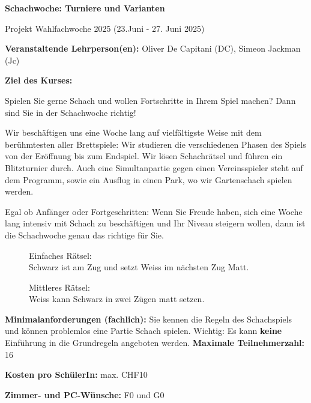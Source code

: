 \documentclass[12pt]{article}
\begin{document}


 
        \Large
        \textbf{Schachwoche: Turniere und Varianten}
 \vspace*{0.3cm}
 
         \Large
Projekt Wahlfachwoche 2025 (23.Juni - 27. Juni 2025) 
 \normalsize
 
 \vfill
 
        \textbf{Veranstaltende Lehrperson(en):} Oliver De Capitani (DC), Simeon Jackman (Jc)
 
        \vfill
        
\textbf{Ziel des Kurses:}

Spielen Sie gerne Schach und wollen Fortschritte in Ihrem Spiel machen? Dann sind Sie in der Schachwoche richtig!

Wir beschäftigen uns eine Woche lang auf vielfältigste Weise mit dem berühmtesten aller Brettspiele: Wir studieren die verschiedenen Phasen des Spiels von der Eröffnung bis zum Endspiel. Wir lösen Schachrätsel und führen ein Blitzturnier durch. Auch eine Simultanpartie gegen einen Vereinsspieler steht auf dem Programm, sowie ein Ausflug in einen Park, wo wir Gartenschach spielen werden.	

Egal ob Anfänger oder Fortgeschritten: Wenn Sie Freude haben, sich eine Woche lang intensiv mit Schach zu beschäftigen und Ihr Niveau steigern wollen, dann ist die Schachwoche genau das richtige für Sie.

\begin{multicols}{2}
\begin{figure}[H]
\centering
\chessboard[smallboard,
setfen=4r3/2k2p1p/B6b/P6p/2bP4/8/1P4PP/R2K3R b - - 2 24,
]
\caption{Einfaches Rätsel: \\ Schwarz ist am Zug und setzt Weiss im nächsten Zug Matt.}
\end{figure}

\begin{figure}[H]
\centering
\chessboard[smallboard,
setfen=r2qk1r1/ppp1bp2/3p1p1p/3Np2Q/2B1P1b1/3P4/PPP2PPP/2KR3R w q - 6 12,
]
\caption{Mittleres Rätsel: \\ Weiss kann Schwarz in zwei Zügen matt setzen.}
\end{figure}
\end{multicols}
 
 		\vfill
 		
 		\textbf{Minimalanforderungen (fachlich):} Sie kennen die Regeln des Schachspiels und können problemlos eine Partie Schach spielen. Wichtig: Es kann {\bf keine} Einführung in die Grundregeln angeboten werden. 
\vfill
\textbf{Maximale Teilnehmerzahl:} 16

\vfill
\textbf{Kosten pro SchülerIn:}	max. CHF10


\vfill

\textbf{Zimmer- und PC-Wünsche:} F0 und G0
                 
\end{document}
